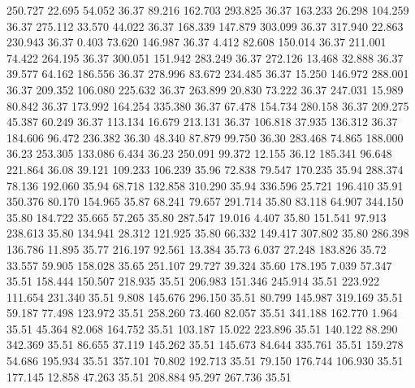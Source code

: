  250.727   22.695   54.052        36.37
  89.216  162.703  293.825        36.37
 163.233   26.298  104.259        36.37
 275.112   33.570   44.022        36.37
 168.339  147.879  303.099        36.37
 317.940   22.863  230.943        36.37
   0.403   73.620  146.987        36.37
   4.412   82.608  150.014        36.37
 211.001   74.422  264.195        36.37
 300.051  151.942  283.249        36.37
 272.126   13.468   32.888        36.37
  39.577   64.162  186.556        36.37
 278.996   83.672  234.485        36.37
  15.250  146.972  288.001        36.37
 209.352  106.080  225.632        36.37
 263.899   20.830   73.222        36.37
 247.031   15.989   80.842        36.37
 173.992  164.254  335.380        36.37
  67.478  154.734  280.158        36.37
 209.275   45.387   60.249        36.37
 113.134   16.679  213.131        36.37
 106.818   37.935  136.312        36.37
 184.606   96.472  236.382        36.30
  48.340   87.879   99.750        36.30
 283.468   74.865  188.000        36.23
 253.305  133.086    6.434        36.23
 250.091   99.372   12.155        36.12
 185.341   96.648  221.864        36.08
  39.121  109.233  106.239        35.96
  72.838   79.547  170.235        35.94
 288.374   78.136  192.060        35.94
  68.718  132.858  310.290        35.94
 336.596   25.721  196.410        35.91
 350.376   80.170  154.965        35.87
  68.241   79.657  291.714        35.80
  83.118   64.907  344.150        35.80
 184.722   35.665   57.265        35.80
 287.547   19.016    4.407        35.80
 151.541   97.913  238.613        35.80
 134.941   28.312  121.925        35.80
  66.332  149.417  307.802        35.80
 286.398  136.786   11.895        35.77
 216.197   92.561   13.384        35.73
   6.037   27.248  183.826        35.72
  33.557   59.905  158.028        35.65
 251.107   29.727   39.324        35.60
 178.195    7.039   57.347        35.51
 158.444  150.507  218.935        35.51
 206.983  151.346  245.914        35.51
 223.922  111.654  231.340        35.51
   9.808  145.676  296.150        35.51
  80.799  145.987  319.169        35.51
  59.187   77.498  123.972        35.51
 258.260   73.460   82.057        35.51
 341.188  162.770    1.964        35.51
  45.364   82.068  164.752        35.51
 103.187   15.022  223.896        35.51
 140.122   88.290  342.369        35.51
  86.655   37.119  145.262        35.51
 145.673   84.644  335.761        35.51
 159.278   54.686  195.934        35.51
 357.101   70.802  192.713        35.51
  79.150  176.744  106.930        35.51
 177.145   12.858   47.263        35.51
 208.884   95.297  267.736        35.51

